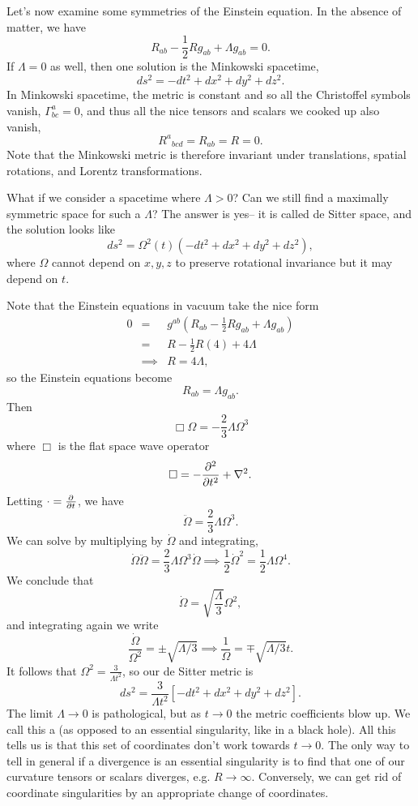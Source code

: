 Let's now examine some symmetries of the Einstein equation. In the absence of matter, we have
$$R_{ab}-\frac{1}{2} R g_{ab} +\Lambda g_{ab}=0.$$
If $\Lambda=0$ as well, then one solution is the Minkowski spacetime,
$$ds^2 = -dt^2 + dx^2 +dy^2 +dz^2.$$
In Minkowski spacetime, the metric is constant and so all the Christoffel symbols vanish, $\Gamma^a_{bc}=0$, and thus all the nice tensors and scalars we cooked up also vanish,
$${R^a}_{bcd}=R_{ab}=R=0.$$ Note that the Minkowski metric is therefore invariant under translations, spatial rotations, and Lorentz transformations.

What if we consider a spacetime where $\Lambda >0$? Can we still find a maximally symmetric space for such a $\Lambda$? The answer is yes-- it is called de Sitter space, and the solution looks like
$$ds^2=\Omega^2(t) (-dt^2+dx^2+dy^2+dz^2),$$
where $\Omega$ cannot depend on $x,y,z$ to preserve rotational invariance but it may depend on $t$.

Note that the Einstein equations in vacuum take the nice form
\begin{eqnarray*}
0&=& g^{ab}(R_{ab}-\frac{1}{2} R g_{ab}+\Lambda g_{ab})\\
&=&R -\frac{1}{2} R (4) +4 \Lambda\\
&\implies& R=4\Lambda,
\end{eqnarray*}
so the Einstein equations become
$$R_{ab}=\Lambda g_{ab}.$$
Then
$$\Box \Omega = -\frac{2}{3} \Lambda \Omega^3$$
where $\Box$ is the flat space wave operator
$$\Box = -\frac{\p^2}{\p t^2}+\nabla^2.$$
Letting $\cdot =\P{}{t}$, we have
$$\ddot \Omega = \frac{2}{3} \Lambda \Omega^3.$$
We can solve by multiplying by $\dot \Omega$ and integrating,
$$\dot \Omega \ddot \Omega = \frac{2}{3} \Lambda \Omega^3 \dot \Omega \implies \frac{1}{2} \dot \Omega^2 = \frac{1}{2} \Lambda \Omega^4.$$
We conclude that
$$\dot \Omega = \sqrt{\frac{\Lambda}{3}} \Omega^2,$$
and integrating again we write
$$\frac{\dot \Omega}{\Omega^2}=\pm\sqrt{\Lambda/3} \implies \frac{1}{\Omega}=\mp \sqrt{\Lambda/3}t.$$
It follows that $\Omega^2=\frac{3}{\Lambda t^2}$, so our de Sitter metric is
$$ds^2 = \frac{3}{\Lambda t^2}[-dt^2+dx^2 +dy^2 +dz^2].$$
The limit $\Lambda \to 0$ is pathological, but as $t\to 0$ the metric coefficients blow up. We call this a  (as opposed to an essential singularity, like in a black hole). All this tells us is that this set of coordinates don't work towards $t\to 0$. The only way to tell in general if a divergence is an essential singularity is to find that one of our curvature tensors or scalars diverges, e.g. $R\to \infty.$ Conversely, we can get rid of coordinate singularities by an appropriate change of coordinates.

